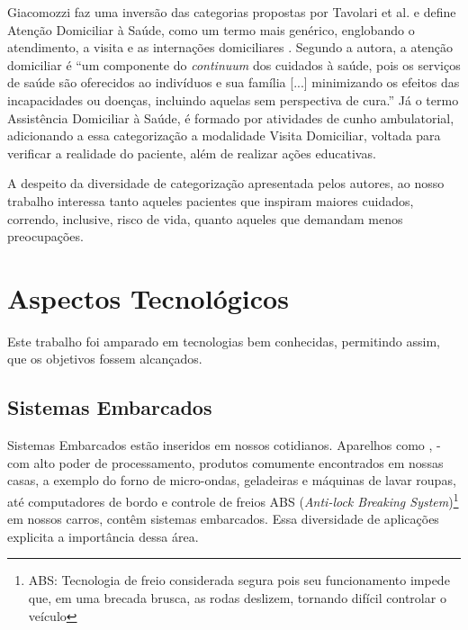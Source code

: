 

Giacomozzi faz uma inversão das categorias propostas por Tavolari et al. e 
define Atenção Domiciliar à Saúde, como um termo mais genérico, englobando
o atendimento, a visita e as internações domiciliares \cite{giacomozzi2006pratica}.
Segundo a autora, a atenção domiciliar é ``um
componente do \textit{continuum} dos cuidados à saúde, pois os serviços de
saúde são oferecidos ao indivíduos e sua família [...] minimizando os efeitos
das incapacidades ou doenças, incluindo aquelas sem perspectiva de cura.''
Já o termo Assistência Domiciliar à Saúde, é formado por atividades de cunho 
ambulatorial, adicionando a essa categorização a modalidade Visita Domiciliar,
voltada para verificar a realidade do paciente, além de realizar ações educativas.  

A despeito da diversidade de categorização apresentada pelos autores, ao nosso
trabalho interessa tanto aqueles pacientes que inspiram maiores cuidados,
correndo, inclusive, risco de vida, quanto aqueles que demandam menos
preocupações.



\section{Aspectos Tecnológicos}\label{sec:aspectos-tecnologicos}

Este trabalho foi amparado em tecnologias bem conhecidas, permitindo assim, 
que os objetivos fossem alcançados.

\subsection{Sistemas Embarcados}\label{subsec:sistemas-embarcados}

Sistemas Embarcados estão inseridos em nossos cotidianos. Aparelhos como
\smartphones[], \tablets[] - com alto poder de processamento,
produtos comumente encontrados em nossas casas, a exemplo do forno de 
micro-ondas, geladeiras e máquinas de lavar roupas, até computadores de bordo e
controle de freios ABS (\textit{Anti-lock Breaking System})\footnote{ABS:
Tecnologia  de freio considerada segura pois seu funcionamento impede que, em
uma brecada brusca, as rodas  deslizem, tornando difícil controlar o veículo} em
nossos carros, contêm sistemas embarcados. Essa diversidade de aplicações
explicita a importância dessa área.

